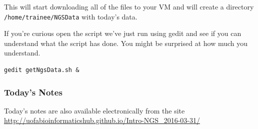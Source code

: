 This will start downloading all of the files to your VM and will create a directory \texttt{/home/trainee/NGSData} with today's data.

\begin{advanced}
If you're curious open the script we've just run using gedit and see if you can understand what the script has done.
You might be surprised at how much you understand.
\begin{lstlisting}
gedit getNgsData.sh &
\end{lstlisting}
\end{advanced}

\subsubsection*{Today's Notes}
Today's notes are also available electronically from the site \url{http://uofabioinformaticshub.github.io/Intro-NGS\_2016-03-31/}